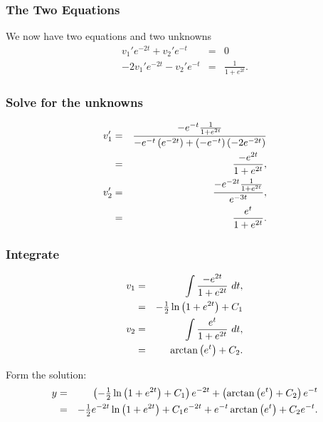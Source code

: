 \begin{frame}
  \frametitle{The Two Equations}

  We now have two equations and two unknowns
  \begin{eqnarray*}
    v_1'e^{-2t} + v_2' e^{-t}& = & 0 \\
    -2 v_1' e^{-2t}  - v_2' e^{-t} & = & \frac{1}{1+e^{2t}}.
  \end{eqnarray*}

\end{frame}

\begin{frame}
  \frametitle{Solve for the unknowns}
  \begin{eqnarray*}
    v_1' & = & \frac{-e^{-t} \frac{1}{1+e^{2t}}}{
      -e^{-t}\left( e^{-2t} \right) + \left( - e^{-t}\right) \left( -2 e^{-2t} \right)} \\
    & = & \frac{-e^{2t}}{1+e^{2t}}, \\
    v_2' & = & \frac{-e^{-2t}\frac{1}{1+e^{2t}}}{e^{-3t}}, \\
    & = & \frac{e^t}{1+e^{2t}}.
  \end{eqnarray*}
\end{frame}

\begin{frame}
  \frametitle{Integrate}

  \begin{eqnarray*}
    v_1 & = & \int \frac{-e^{2t}}{1+e^{2t}} ~ dt, \\
    & = & -\mbox{$\frac{1}{2}$} \ln\left( 1 + e^{2t} \right) + C_1 \\
    v_2 & = & \int \frac{e^t}{1+e^{2t}} ~ dt, \\
    & = & \arctan\left( e^t \right) + C_2.
  \end{eqnarray*}

  Form the solution:
  \begin{eqnarray*}
    y & = & \left( -\mbox{$\frac{1}{2}$} \ln\left( 1 + e^{2t} \right) + C_1 \right) e^{-2t} + \left( \arctan\left( e^t \right) + C_2 \right) e^{-t} \\
    & = & -\mbox{$\frac{1}{2}$} e^{-2t} \ln \left( 1 + e^{2t} \right) + C_1 e^{-2t} + e^{-t} \arctan\left( e^t \right) + C_2 e^{-t}.
  \end{eqnarray*}

\end{frame}


